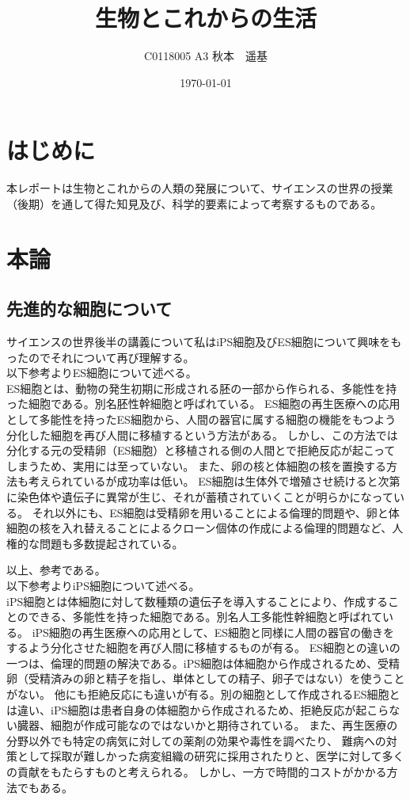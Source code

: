 \documentclass[uplatex, titlepage]{jsarticle}
\title{生物とこれからの生活}
\author{C0118005 A3 秋本　遥基}
\date{\today}
\begin{document}
\maketitle

\section{はじめに}

 本レポートは生物とこれからの人類の発展について、サイエンスの世界の授業（後期）を通して得た知見及び、科学的要素によって考察するものである。

\section{本論}

\subsection{先進的な細胞について}

  サイエンスの世界後半の講義について私はiPS細胞及びES細胞について興味をもったのでそれについて再び理解する。\\
  以下参考よりES細胞について述べる\cite{ES}。\\
  ES細胞とは、動物の発生初期に形成される胚の一部から作られる、多能性を持った細胞である。別名胚性幹細胞と呼ばれている。
  ES細胞の再生医療への応用として多能性を持ったES細胞から、人間の器官に属する細胞の機能をもつよう分化した細胞を再び人間に移植するという方法がある。
  しかし、この方法では分化する元の受精卵（ES細胞）と移植される側の人間とで拒絶反応が起こってしまうため、実用には至っていない。
  また、卵の核と体細胞の核を置換する方法も考えられているが成功率は低い。
  ES細胞は生体外で増殖させ続けると次第に染色体や遺伝子に異常が生じ、それが蓄積されていくことが明らかになっている。
  それ以外にも、ES細胞は受精卵を用いることによる倫理的問題や、卵と体細胞の核を入れ替えることによるクローン個体の作成による倫理的問題など、人権的な問題も多数提起されている。

以上、参考である。\\

  以下参考よりiPS細胞について述べる\cite{iPS}。\\
  iPS細胞とは体細胞に対して数種類の遺伝子を導入することにより、作成することのできる、多能性を持った細胞である。別名人工多能性幹細胞と呼ばれている。
  iPS細胞の再生医療への応用として、ES細胞と同様に人間の器官の働きをするよう分化させた細胞を再び人間に移植するものが有る。
  ES細胞との違いの一つは、倫理的問題の解決である。iPS細胞は体細胞から作成されるため、受精卵（受精済みの卵と精子を指し、単体としての精子、卵子ではない）を使うことがない。
  他にも拒絶反応にも違いが有る。別の細胞として作成されるES細胞とは違い、iPS細胞は患者自身の体細胞から作成されるため、拒絶反応が起こらない臓器、細胞が作成可能なのではないかと期待されている。
  また、再生医療の分野以外でも特定の病気に対しての薬剤の効果や毒性を調べたり、
  難病への対策として採取が難しかった病変組織の研究に採用されたりと、医学に対して多くの貢献をもたらすものと考えられる。
  しかし、一方で時間的コストがかかる方法でもある。\\
\end{document}
